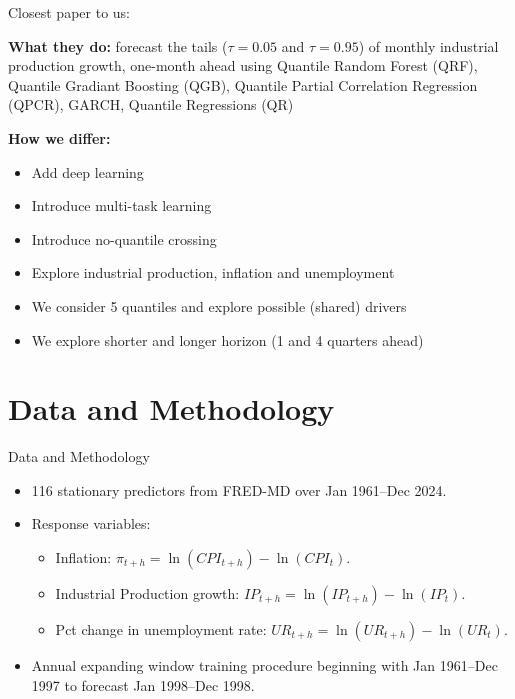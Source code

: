 \documentclass[aspectratio=169]{beamer}
\begin{document}
\begin{frame}{Closest paper to us: \textcite{Adrian2025}}

	\textbf{What they do:} forecast the tails ($\tau=0.05$ and $\tau=0.95$) of monthly industrial production growth, one-month ahead using Quantile Random Forest (QRF), Quantile Gradiant Boosting (QGB), Quantile Partial Correlation Regression (QPCR), GARCH, Quantile Regressions (QR)
    
    \vspace{.4cm}
	\textbf{How we differ:} 
	\begin{itemize}
		\item Add deep learning
        \item Introduce multi-task learning
        \item Introduce no-quantile crossing
        \item Explore industrial production, inflation and unemployment
        \item We consider 5 quantiles and explore possible (shared) drivers
        \item We explore shorter and longer horizon (1 and 4 quarters ahead)
	\end{itemize}

\end{frame}



\section{Data and Methodology}


\begin{frame}{Data and Methodology}
    \begin{itemize}
        \item 116 stationary predictors from FRED-MD over Jan 1961--Dec 2024.
        \item Response variables: 
            \begin{itemize}
                \item Inflation: $\pi_{t+h} = \ln(CPI_{t+h}) - \ln(CPI_{t})$.
                \item Industrial Production growth: $IP_{t+h} = \ln(IP_{t+h}) - \ln(IP_{t})$.
                \item Pct change in unemployment rate: $UR_{t+h} = \ln(UR_{t+h}) - \ln(UR_{t})$.
            \end{itemize} 
        \item Annual expanding window training procedure beginning with Jan 1961--Dec 1997 to forecast Jan 1998--Dec 1998.
    \end{itemize}
\end{frame}
\end{document}
